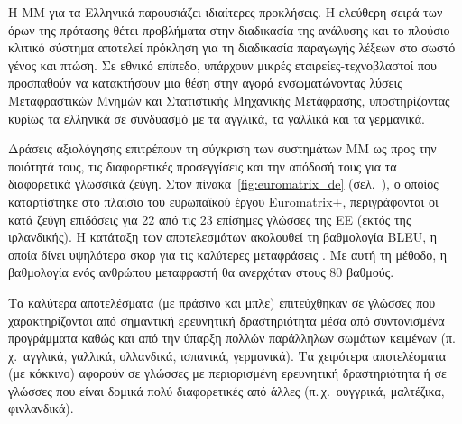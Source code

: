 \documentclass[]{../../metanetpaper}
\begin{document}
\begin{multicols}{2}

Η ΜΜ για τα Ελληνικά παρουσιάζει ιδιαίτερες προκλήσεις. Η ελεύθερη σειρά των όρων της πρότασης  θέτει προβλήματα στην διαδικασία της ανάλυσης και το πλούσιο κλιτικό σύστημα αποτελεί πρόκληση για τη διαδικασία παραγωγής λέξεων στο σωστό γένος και πτώση. Σε εθνικό επίπεδο, υπάρχουν μικρές εταιρείες-τεχνοβλαστοί που προσπαθούν να κατακτήσουν μια θέση στην αγορά ενσωματώνοντας λύσεις Μεταφραστικών Μνημών και Στατιστικής Μηχανικής Μετάφρασης, υποστηρίζοντας κυρίως τα ελληνικά σε συνδυασμό με τα αγγλικά, τα γαλλικά και τα γερμανικά.

Δράσεις αξιολόγησης επιτρέπουν τη σύγκριση των συστημάτων MΜ ως προς την ποιότητά τους, τις διαφορετικές προσεγγίσεις και την απόδοσή τους για τα διαφορετικά γλωσσικά ζεύγη. Στον πίνακα~\ref{fig:euromatrix_de} (σελ.~\pageref{fig:euromatrix_de}), ο οποίος καταρτίστηκε στο πλαίσιο του ευρωπαϊκού έργου Euromatrix+, περιγράφονται οι κατά ζεύγη επιδόσεις για 22 από τις 23 επίσημες γλώσσες της ΕΕ (εκτός της ιρλανδικής). Η κατάταξη των αποτελεσμάτων ακολουθεί τη βαθμολογία BLEU, η οποία δίνει υψηλότερα σκορ για τις καλύτερες μεταφράσεις \cite{bleu1}. Με αυτή τη μέθοδο, η βαθμολογία ενός ανθρώπου μεταφραστή θα ανερχόταν στους 80 βαθμούς.

Τα καλύτερα αποτελέσματα (με πράσινο και μπλε) επιτεύχθηκαν σε γλώσσες που χαρακτηρίζονται από σημαντική ερευνητική δραστηριότητα μέσα από συντονισμένα προγράμματα καθώς και από την ύπαρξη πολλών παράλληλων σωμάτων κειμένων (π.\,χ.~αγγλικά, γαλλικά, ολλανδικά, ισπανικά, γερμανικά). Τα χειρότερα αποτελέσματα (με κόκκινο) αφορούν σε γλώσσες με περιορισμένη ερευνητική δραστηριότητα ή σε γλώσσες που είναι δομικά πολύ διαφορετικές από άλλες (π.\,χ.~ουγγρικά, μαλτέζικα, φινλανδικά).


\end{multicols}
\end{document}

